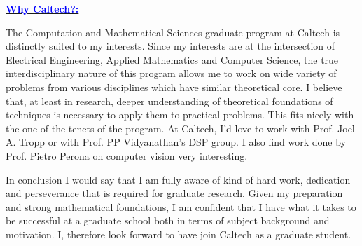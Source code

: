 \documentclass[11pt]{article}
\newcommand{\statement}[1]{\par\medskip
  \underline{\textcolor{blue}{\textbf{#1:}}}\space
}
\begin{document}
\statement{Why Caltech?}
The Computation and Mathematical Sciences graduate program at Caltech is distinctly suited to my interests. 
Since my interests are at the intersection of Electrical Engineering, Applied Mathematics and Computer Science, the true interdisciplinary nature of this program allows me to work on wide variety of problems from various disciplines which have similar theoretical core. 
I believe that, at least in research, deeper understanding of theoretical foundations of techniques is necessary to apply them to practical problems. 
This fits nicely with the one of the tenets of the program. 
At Caltech, I'd love to work with Prof. Joel A. Tropp or with Prof. PP Vidyanathan's DSP group. I also find work done by Prof. Pietro Perona on computer vision very interesting.

\medskip
In conclusion I would say that I am fully aware of kind of hard work, dedication and perseverance that is required for graduate research. Given my preparation and strong mathematical foundations,  I am confident that I have what it takes to be successful at a graduate school both in terms of subject background and motivation. I, therefore look forward to have join Caltech as a graduate student.
\end{document}
